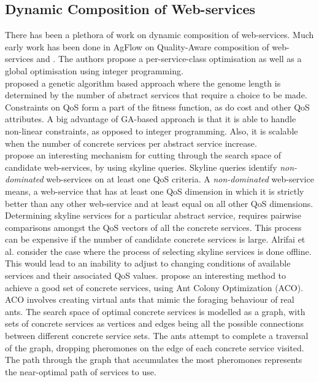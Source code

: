 \documentclass[10pt,journal,compsoc]{IEEEtran}
\begin{document}
\subsection{Dynamic Composition of Web-services}
There has been a plethora of work on dynamic composition of web-services. Much early work has been done in AgFlow \cite{Zeng2001AgFlow} on Quality-Aware composition of web-services \cite{Benatallah2002Declarative} and \cite{Zeng2003Quality}. The authors propose a per-service-class optimisation as well as a global optimisation using integer programming.\\
\cite{Canfora2005approach} proposed a genetic algorithm based approach where the genome length is determined by the number of abstract services that require a choice to be made. Constraints on QoS form a part of the fitness function, as do cost and other QoS attributes. A big advantage of GA-based approach is that it is able to handle non-linear constraints, as opposed to integer programming. Also, it is scalable when the number of concrete services per abstract service increase.\\
\cite{Alrifai2010Selecting} propose an interesting mechanism for cutting through the search space of candidate web-services, by using skyline queries. Skyline queries identify \textit{non-dominated} web-services on at least one QoS criteria. A \textit{non-dominated} web-service means, a web-service that has at least one QoS dimension in which it is strictly better than any other web-service and at least equal on all other QoS dimensions. Determining skyline services for a particular abstract service, requires pairwise comparisons amongst the QoS vectors of all the concrete services. This process can be expensive if the number of candidate concrete services is large. Alrifai et al. consider the case where the process of selecting skyline services is done offline. This would lead to an inability to adjust to changing conditions of available services and their associated QoS values. 	
\cite{Zhang2010QoS-Based} propose an interesting method to achieve a good set of concrete services, using Ant Colony Optimization (ACO). ACO involves creating virtual ants that mimic the foraging behaviour of real ants. The search space of optimal concrete services is modelled as a graph, with sets of concrete services as vertices and edges being all the possible connections between different concrete service sets. The ants attempt to complete a traversal of the graph, dropping pheromones on the edge of each concrete service visited. The path through the graph that accumulates the most pheromones represents the near-optimal path of services to use.
\end{document}
